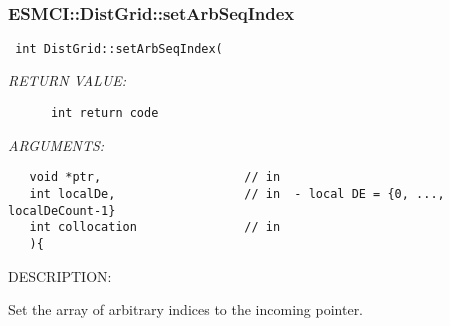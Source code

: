  
\mbox{}\hrulefill\
 
\subsubsection [ESMCI::DistGrid::setArbSeqIndex] {ESMCI::DistGrid::setArbSeqIndex}


  
\begin{verbatim} int DistGrid::setArbSeqIndex(\end{verbatim}{\em RETURN VALUE:}
\begin{verbatim}      int return code\end{verbatim}{\em ARGUMENTS:}
\begin{verbatim}   void *ptr,                    // in
   int localDe,                  // in  - local DE = {0, ..., localDeCount-1}
   int collocation               // in
   ){\end{verbatim}
{\sf DESCRIPTION:\\ }


      Set the array of arbitrary indices to the incoming pointer.
  
\setlength{\parskip}{\oldparskip}
\setlength{\parindent}{\oldparindent}
\setlength{\baselineskip}{\oldbaselineskip}
